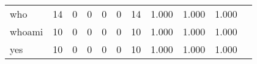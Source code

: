 \begin{longtable}{lp{1.2cm}p{1.2cm}p{1.2cm}p{1.2cm}p{1.2cm}p{1.2cm}p{1.2cm}p{1.2cm}p{1.2cm}p{1.2cm}}
who       &                                    14 &                                                  0 &                                                  0 &                                                  0 &                                                  0 &                                                 14 &                                         1.000 &                                              1.000 &                                              1.000 \\
whoami    &                                    10 &                                                  0 &                                                  0 &                                                  0 &                                                  0 &                                                 10 &                                         1.000 &                                              1.000 &                                              1.000 \\
yes       &                                    10 &                                                  0 &                                                  0 &                                                  0 &                                                  0 &                                                 10 &                                         1.000 &                                              1.000 &                                              1.000 \\
\end{longtable}
